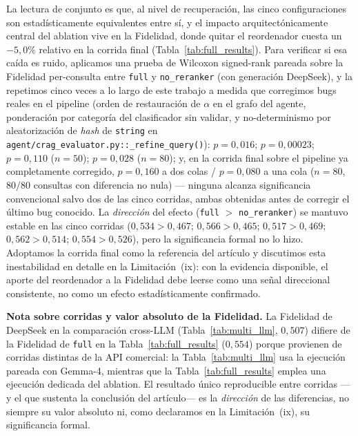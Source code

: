 \documentclass[runningheads]{llncs}
\begin{document}
La lectura de conjunto es que, al nivel de recuperaci\'{o}n, las cinco configuraciones son estad\'{i}sticamente equivalentes entre s\'{i}, y el impacto arquitect\'{o}nicamente central del ablation vive en la Fidelidad, donde quitar el reordenador cuesta un $-5{,}0\%$ relativo en la corrida final (Tabla~\ref{tab:full_results}). Para verificar si esa ca\'{i}da es ruido, aplicamos una prueba de Wilcoxon signed-rank pareada sobre la Fidelidad per-consulta entre \texttt{full} y \texttt{no\_reranker} (con generaci\'{o}n DeepSeek), y la repetimos cinco veces a lo largo de este trabajo a medida que corregimos bugs reales en el pipeline (orden de restauraci\'{o}n de $\alpha$ en el grafo del agente, ponderaci\'{o}n por categor\'{i}a del clasificador sin validar, y no-determinismo por aleatorizaci\'{o}n de \emph{hash} de \texttt{string} en \texttt{agent/crag\_evaluator.py::\_refine\_query()}): $p{=}0{,}016$; $p{=}0{,}00023$; $p{=}0{,}110$ ($n{=}50$); $p{=}0{,}028$ ($n{=}80$); y, en la corrida final sobre el pipeline ya completamente corregido, $p{=}0{,}160$ a dos colas / $p{=}0{,}080$ a una cola ($n{=}80$, $80/80$ consultas con diferencia no nula) — ninguna alcanza significancia convencional salvo dos de las cinco corridas, ambas obtenidas antes de corregir el \'{u}ltimo bug conocido. La \emph{direcci\'{o}n} del efecto (\texttt{full} $>$ \texttt{no\_reranker}) se mantuvo estable en las cinco corridas ($0{,}534{>}0{,}467$; $0{,}566{>}0{,}465$; $0{,}517{>}0{,}469$; $0{,}562{>}0{,}514$; $0{,}554{>}0{,}526$), pero la significancia formal no lo hizo. Adoptamos la corrida final como la referencia del art\'{i}culo y discutimos esta inestabilidad en detalle en la Limitaci\'{o}n~(ix): con la evidencia disponible, el aporte del reordenador a la Fidelidad debe leerse como una se\~{n}al direccional consistente, no como un efecto estad\'{i}sticamente confirmado.

\textbf{Nota sobre corridas y valor absoluto de la Fidelidad.} La Fidelidad de DeepSeek en la comparaci\'{o}n cross-LLM (Tabla~\ref{tab:multi_llm}, $0{,}507$) difiere de la Fidelidad de \texttt{full} en la Tabla~\ref{tab:full_results} ($0{,}554$) porque provienen de corridas distintas de la API comercial: la Tabla~\ref{tab:multi_llm} usa la ejecuci\'{o}n pareada con Gemma-4, mientras que la Tabla~\ref{tab:full_results} emplea una ejecuci\'{o}n dedicada del ablation. El resultado \'{u}nico reproducible entre corridas —y el que sustenta la conclusi\'{o}n del art\'{i}culo— es la \emph{direcci\'{o}n} de las diferencias, no siempre su valor absoluto ni, como declaramos en la Limitaci\'{o}n~(ix), su significancia formal.
\end{document}
